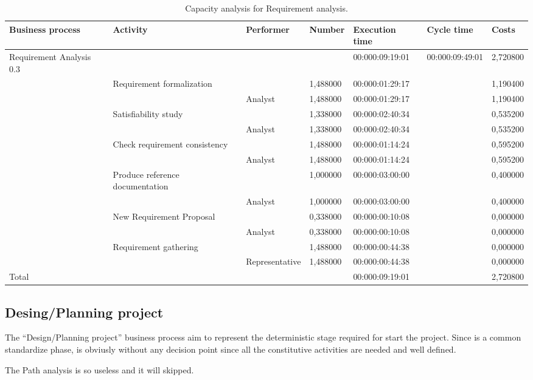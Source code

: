 \begin{landscape}
\begin{table}
\centering
{\tiny
\begin{tabular}{|l|l|l|l|l|l|l|}
Business process&Activity&Performer&Number&Execution time&Cycle time&Costs\\
\hline
Requirement Analysis 0.3&&&&00:000:09:19:01&00:000:09:49:01&2,720800\\
\hline
&Requirement formalization &&1,488000&00:000:01:29:17&&1,190400\\
\hline
&&Analyst &1,488000&00:000:01:29:17&&1,190400\\
\hline
&Satisfiability study &&1,338000&00:000:02:40:34&&0,535200\\
\hline
&&Analyst &1,338000&00:000:02:40:34&&0,535200\\
\hline
&Check requirement consistency &&1,488000&00:000:01:14:24&&0,595200\\
\hline
&&Analyst &1,488000&00:000:01:14:24&&0,595200\\
\hline
&Produce reference documentation &&1,000000&00:000:03:00:00&&0,400000\\
\hline
&&Analyst &1,000000&00:000:03:00:00&&0,400000\\
\hline
&New Requirement Proposal &&0,338000&00:000:00:10:08&&0,000000\\
\hline
&&Analyst &0,338000&00:000:00:10:08&&0,000000\\
\hline
&Requirement gathering &&1,488000&00:000:00:44:38&&0,000000\\
\hline
&&Representative &1,488000&00:000:00:44:38&&0,000000\\
\hline
Total&&&&00:000:09:19:01&&2,720800
\end{tabular}
}
\caption{Capacity analysis for Requirement analysis.}
\end{table}
\end{landscape}
%

%

\subsection{Desing/Planning project}
The ``Design/Planning project'' business process aim to represent the deterministic stage required for start the project. Since is a common standardize phase, is obviusly without any decision point since all the constitutive activities are needed and well defined. 

The Path analysis is so useless and it will skipped.

